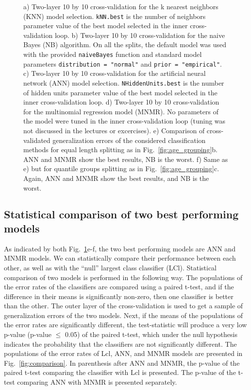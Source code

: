 \documentclass[10pt, paper=a4]{article}
\begin{document}
\begin{figure}[h!]
\begin{minipage}{0.49\textwidth}
  \end{minipage} \hfill
  \cprotect\caption{a) Two-layer 10 by 10 cross-validation for the k
    nearest neighbors (KNN) model selection.  \verb|kNN.best| is the
    number of neighbors parameter value of the best model selected in
    the inner cross-validation loop.  b) Two-layer 10 by 10
    cross-validation for the naive Bayes (NB) algorithm.  On all the
    splits, the default model was used with the provided
    \verb|naiveBayes| function and standard model parameters
    \verb|distribution = "normal"| and \verb|prior = "empirical"|.  c)
    Two-layer 10 by 10 cross-validation for the artificial neural
    network (ANN) model selection.  \verb|NHiddenUnits.best| is the
    number of hidden units parameter value of the best model selected
    in the inner cross-validation loop.  d) Two-layer 10 by 10
    cross-validation for the multinomial regression model (MNMR). No
    parameters of the model were tuned in the inner cross-validation
    loop (tuning was not discussed in the lectures or excercises). e)
    Comparison of cross-validated generalization errors of the
    considered classification methods for equal length splitting as in
    Fig.~\ref{fig:age_grouping}b.  ANN and MNMR show the best results,
    NB is the worst.  f) Same as e) but for quantile groups splitting
    as in Fig.~\ref{fig:age_grouping}c.  Again, ANN and MNMR show the
    best results, and NB is the worst.}
  \label{fig:performance}
\end{figure}

\subsection{Statistical comparison of two best performing models}
As indicated by both Fig.~\ref{fig:performance}e-f, the two best
performing models are ANN and MNMR models.  We can statistically
compare their performance between each other, as well as with the
``null'' largest class classifier (LCl).  Statistical comparison of
two models is performed in the following way.  The populations of the
error rates of the classifiers are compared using a paired t-test, and
if the difference in their means is significantly non-zero, then one
classifier is better than the other.  The outer layer of the
cross-validation is used to get a sample of generalization errors of
the two models.  Next, if the means of the populations of the error
rates are significantly different, the test-statistic will produce a
very low p-value (p-value $\leq$ 0.05) of the paired t-test, which
under the null hypothesis indicates the probability that the
classifiers are not significantly different.  The populations of the
error rates of Lcl, ANN, and MNMR models are presented in
Fig.~\ref{fig:comparison}.  In parenthesis after ANN and MNMR, the
p-value of the paired t-test comparing the classifier with Lcl is
presented.  The p-value of the t-test comparing ANN with MNMR is
presented separately.
\end{document}
